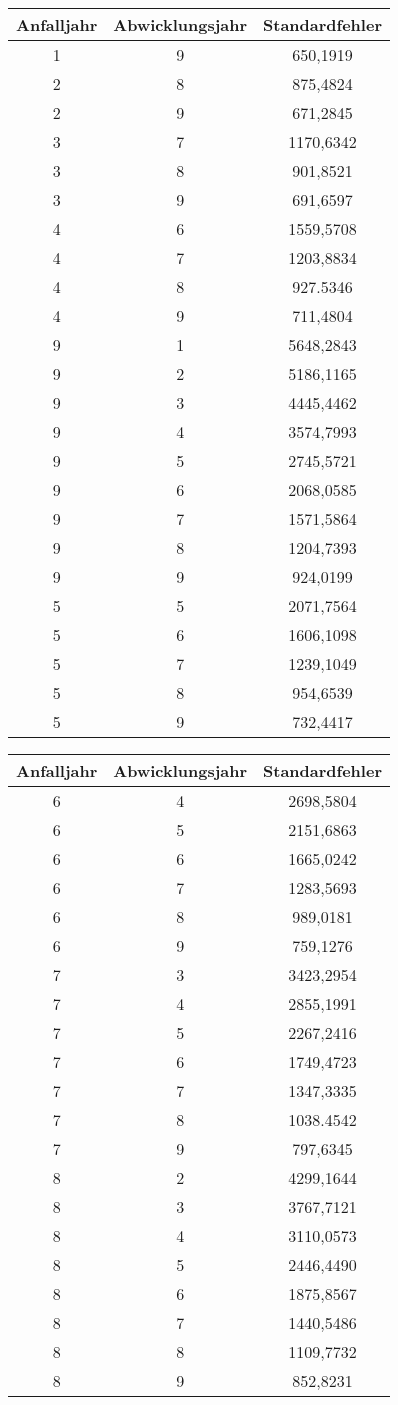 \documentclass[twocolumn,10pt]{article}
\begin{document}
\begin{tabular}{ccc}
\toprule
Anfalljahr & Abwicklungsjahr & Standardfehler \\
\midrule 
1 & 9 & 650,1919 \\ 
\midrule
2 & 8 & 875,4824 \\
2 & 9 & 671,2845 \\
\midrule 
3 & 7 & 1170,6342 \\
3 & 8 & 901,8521 \\
3 & 9 & 691,6597 \\
\midrule
4 & 6 & 1559,5708 \\
4 & 7 & 1203,8834 \\
4 & 8 & 927.5346 \\
4 & 9 & 711,4804 \\
\midrule
9 & 1 & 5648,2843 \\
9 & 2 & 5186,1165 \\
9 & 3 & 4445,4462 \\
9 & 4 & 3574,7993 \\
9 & 5 & 2745,5721 \\
9 & 6 & 2068,0585 \\
9 & 7 & 1571,5864 \\
9 & 8 & 1204,7393 \\
9 & 9 & 924,0199 \\
\midrule
5 & 5 & 2071,7564 \\
5 & 6 & 1606,1098 \\
5 & 7 & 1239,1049 \\
5 & 8 & 954,6539 \\
5 & 9 & 732,4417 \\
\bottomrule
\end{tabular}
\begin{tabular}{ccc}
\toprule
Anfalljahr & Abwicklungsjahr & Standardfehler \\
\midrule 
6 & 4 & 2698,5804 \\
6 & 5 & 2151,6863 \\
6 & 6 & 1665,0242 \\
6 & 7 & 1283,5693 \\
6 & 8 & 989,0181 \\
6 & 9 & 759,1276 \\
\midrule
7 & 3 & 3423,2954 \\
7 & 4 & 2855,1991 \\
7 & 5 & 2267,2416 \\
7 & 6 & 1749,4723 \\
7 & 7 & 1347,3335 \\
7 & 8 & 1038.4542 \\
7 & 9 & 797,6345 \\
\midrule
8 & 2 & 4299,1644 \\
8 & 3 & 3767,7121 \\
8 & 4 & 3110,0573 \\
8 & 5 & 2446,4490 \\
8 & 6 & 1875,8567 \\
8 & 7 & 1440,5486 \\
8 & 8 & 1109,7732 \\
8 & 9 & 852,8231 \\
\bottomrule
\end{tabular}
\end{document}
